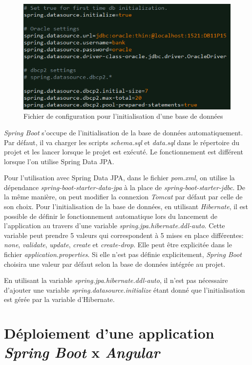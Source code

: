 \documentclass{polytech/polytech}
\begin{document}
\begin{figure}
	\includegraphics[scale=0.9]{images/bddProperties}
	\caption{Fichier de configuration pour l'initialisation d'une base de données}
	\label{fig:bddProperties}
\end{figure}

\textit{Spring Boot} s’occupe de l’initialisation de la base de données automatiquement. Par défaut, il va charger les scripts \textit{schema.sql} et \textit{data.sql} dans le répertoire du projet et les lancer lorsque le projet est exécuté. Le fonctionnement est différent lorsque l’on utilise Spring Data JPA. 

Pour l’utilisation avec Spring Data JPA, dans le fichier \textit{pom.xml}, on utilise la dépendance \textit{spring-boot-starter-data-jpa} à la place de \textit{spring-boot-starter-jdbc}. De la même manière, on peut modifier la connexion \textit{Tomcat} par défaut par celle de son choix. Pour l’initialisation de la base de données, en utilisant \textit{Hibernate}, il est possible de définir le fonctionnement automatique lors du lancement de l’application au travers d’une variable \textit{spring.jpa.hibernate.ddl-auto}. Cette variable peut prendre 5 valeurs qui correspondent à 5 mises en place différentes: \textit{none}, \textit{validate}, \textit{update}, \textit{create} et \textit{create-drop}. Elle peut être explicitée dans le fichier \textit{application.properties}. Si elle n’est pas définie explicitement, \textit{Spring Boot} choisira une valeur par défaut selon la base de données intégrée au projet. 

En utilisant la variable \textit{spring.jpa.hibernate.ddl-auto}, il n’est pas nécessaire d’ajouter une variable \textit{spring.datasource.initialize} étant donné que l’initialisation est gérée par la variable d’Hibernate.


\section{Déploiement d'une application \textit{Spring Boot} x \textit{Angular}}
\end{document}
